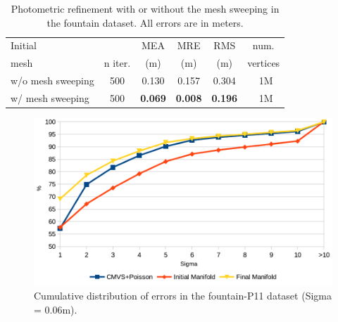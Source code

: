 \begin{table}[t]
\caption{Photometric refinement with or without the mesh sweeping  in the fountain dataset. All errors are in meters.}
\label{tab:resFountPhoto}
\setlength{\tabcolsep}{4px}
\scriptsize
\centering
\begin{tabular}{lccccc}
\toprule 
Initial & & MEA & MRE & RMS & num. \\
mesh & n iter. & (m) & (m) & (m) & vertices \\
\midrule
w/o mesh sweeping &500& 0.130 & 0.157 & 0.304 & ~1M\\
w/ mesh sweeping &500& \textbf{0.069} & \textbf{0.008} & \textbf{0.196} & ~1M\\
\end{tabular}
\end{table}




\begin{figure}[t]
\centering
\includegraphics[width=\columnwidth]{./img/hist}
\caption{Cumulative distribution of errors in the fountain-P11 dataset (Sigma = 0.06m).}
\label{fig:fountainhist}
\end{figure}


